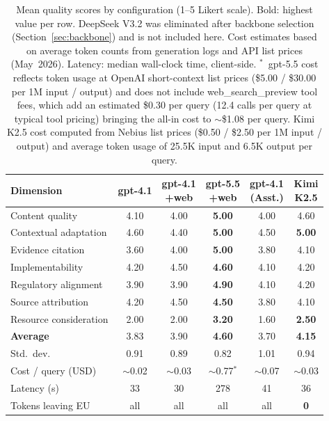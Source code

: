 \documentclass[runningheads]{llncs}
\begin{document}
\begin{table}[t]
\caption{Mean quality scores by configuration (1--5 Likert scale). Bold:
highest value per row. DeepSeek V3.2 was eliminated after backbone
selection (Section~\ref{sec:backbone}) and is not included here.
Cost estimates based on average token counts from generation logs and
API list prices (May~2026). Latency: median wall-clock time, client-side.
$^{\ast}$~gpt-5.5 cost reflects token usage at OpenAI short-context list
prices (\$5.00 / \$30.00 per 1M input / output) and does not include
web\_search\_preview tool fees, which add an estimated \$0.30 per query
(12.4 calls per query at typical tool pricing) bringing the all-in cost to
$\sim$\$1.08 per query. Kimi K2.5 cost computed from Nebius list prices
(\$0.50 / \$2.50 per 1M input / output) and average token usage of 25.5K
input and 6.5K output per query.}
\label{tab:results}
\footnotesize
\begin{tabularx}{\linewidth}{X c c c c c}
\toprule
Dimension &
gpt-4.1 &
\shortstack{gpt-4.1\\+web} &
\shortstack{\textbf{gpt-5.5}\\+web} &
\shortstack{gpt-4.1\\(Asst.)} &
\shortstack{\textbf{Kimi}\\K2.5} \\
\midrule
Content quality        & 4.10 & 4.00 & \textbf{5.00} & 4.00 & 4.60 \\
Contextual adaptation  & 4.60 & 4.40 & \textbf{5.00} & 4.50 & \textbf{5.00} \\
Evidence citation      & 3.60 & 4.00 & \textbf{5.00} & 3.80 & 4.10 \\
Implementability       & 4.20 & 4.50 & \textbf{4.60} & 4.10 & 4.20 \\
Regulatory alignment   & 3.90 & 3.90 & \textbf{4.90} & 4.10 & 4.20 \\
Source attribution     & 4.20 & 4.50 & \textbf{4.50} & 3.80 & 4.10 \\
Resource consideration & 2.00 & 2.00 & \textbf{3.20} & 1.60 & \textbf{2.50} \\
\midrule
\textbf{Average}       & 3.83 & 3.90 & \textbf{4.60} & 3.70 & \textbf{4.15} \\
Std.\ dev.\            & 0.91 & 0.89 & 0.82 & 1.01 & 0.94 \\
\midrule
Cost / query (USD)     & $\sim$0.02 & $\sim$0.03 & $\sim$0.77$^{\ast}$ & $\sim$0.07 & $\sim$0.03 \\
Latency (s)            & 33 & 30 & 278 & 41 & 36 \\
Tokens leaving EU      & all & all & all & all & \textbf{0} \\
\bottomrule
\end{tabularx}
\end{table}
\end{document}
